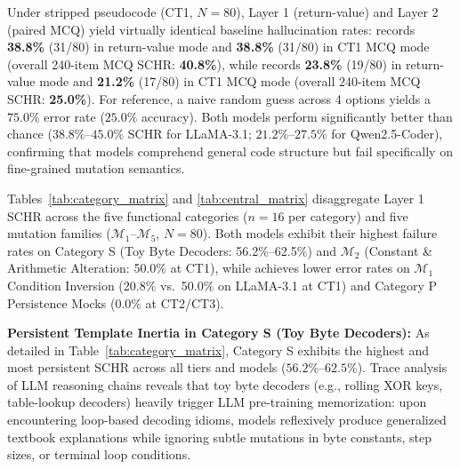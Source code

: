 \documentclass[conference]{IEEEtran}
\begin{document}
Under stripped pseudocode (CT1, $N=80$), Layer 1 (return-value) and Layer 2 (paired MCQ) yield virtually identical baseline hallucination rates:  records \textbf{38.8\%} (31/80) in return-value mode and \textbf{38.8\%} (31/80) in CT1 MCQ mode (overall 240-item MCQ SCHR: \textbf{40.8\%}), while  records \textbf{23.8\%} (19/80) in return-value mode and \textbf{21.2\%} (17/80) in CT1 MCQ mode (overall 240-item MCQ SCHR: \textbf{25.0\%}). For reference, a naive random guess across 4 options yields a $75.0\%$ error rate ($25.0\%$ accuracy). Both models perform significantly better than chance ($38.8\%\text{--}45.0\%$ SCHR for LLaMA-3.1; $21.2\%\text{--}27.5\%$ for Qwen2.5-Coder), confirming that models comprehend general code structure but fail specifically on fine-grained mutation semantics.

Tables~\ref{tab:category_matrix} and \ref{tab:central_matrix} disaggregate Layer 1 SCHR across the five functional categories ($n=16$ per category) and five mutation families ($\mathcal{M}_1$--$\mathcal{M}_5$, $N=80$). Both models exhibit their highest failure rates on Category S (Toy Byte Decoders: 56.2\%--62.5\%) and $\mathcal{M}_2$ (Constant \& Arithmetic Alteration: 50.0\% at CT1), while  achieves lower error rates on $\mathcal{M}_1$ Condition Inversion (20.8\% vs.\ 50.0\% on LLaMA-3.1 at CT1) and Category P Persistence Mocks (0.0\% at CT2/CT3).

\textbf{Persistent Template Inertia in Category S (Toy Byte Decoders):} As detailed in Table~\ref{tab:category_matrix}, Category S exhibits the highest and most persistent SCHR across all tiers and models ($56.2\%\text{--}62.5\%$). Trace analysis of LLM reasoning chains reveals that toy byte decoders (e.g., rolling XOR keys, table-lookup decoders) heavily trigger LLM pre-training memorization: upon encountering loop-based decoding idioms, models reflexively produce generalized textbook explanations while ignoring subtle mutations in byte constants, step sizes, or terminal loop conditions.
\end{document}
